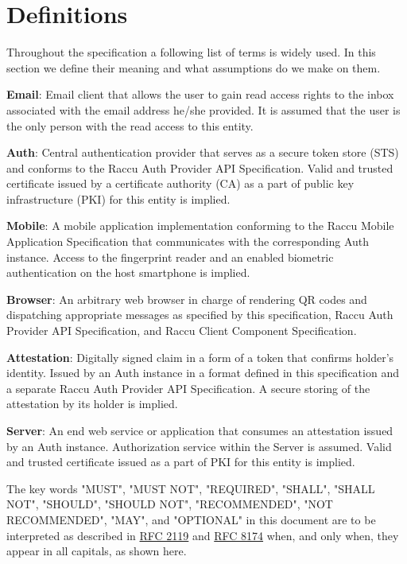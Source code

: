 \section{Definitions}
Throughout the specification a following list of terms is widely used. In this section we define their meaning 
and what assumptions do we make on them.

\medskip
\textbf{Email}: Email client that allows the user to gain read access rights to the inbox associated
with the email address he/she provided. It is assumed that the user is the only person with the read access 
to this entity.

\medskip
\textbf{Auth}: Central authentication provider that serves as a secure token store (STS) and conforms to 
the Raccu Auth Provider API Specification. Valid and trusted certificate issued by a certificate authority
(CA) as a part of public key infrastructure (PKI) for this entity is implied.

\medskip
\textbf{Mobile}: A mobile application implementation conforming to the Raccu Mobile Application Specification 
that communicates with the corresponding Auth instance. Access to the fingerprint reader and an enabled biometric 
authentication on the host smartphone is implied.

\medskip
\textbf{Browser}: An arbitrary web browser in charge of rendering QR codes and dispatching appropriate messages  
as specified by this specification, Raccu Auth Provider API Specification, and Raccu Client Component Specification.

\medskip
\textbf{Attestation}: Digitally signed claim in a form of a token that confirms holder's identity. Issued by 
an Auth instance in a format defined in this specification and a separate Raccu Auth Provider API Specification. 
A secure storing of the attestation by its holder is implied.

\medskip
\textbf{Server}: An end web service or application that consumes an attestation issued by an Auth instance. 
Authorization service within the Server is assumed. Valid and trusted certificate issued as a part of PKI 
for this entity is implied.

\medskip
The key words "MUST", "MUST NOT", "REQUIRED", "SHALL", "SHALL NOT", "SHOULD", "SHOULD NOT", "RECOMMENDED", 
"NOT RECOMMENDED", "MAY", and "OPTIONAL" in this document are to be interpreted as described in 
\href{https://tools.ietf.org/html/rfc2119}{RFC 2119} and \href{https://tools.ietf.org/html/rfc8174}{RFC 8174} 
when, and only when, they appear in all capitals, as shown here.
